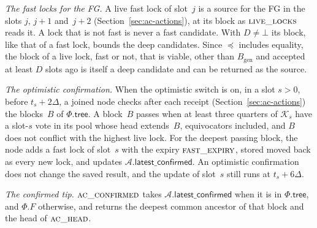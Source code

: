 \documentclass{article}
\newcommand{\genesis}{B_{\mathrm{gen}}}
\newcommand{\committee}{\mathcal K}
\newcommand{\AC}{\mathcal A}
\newcommand{\Fr}{\Phi}
\newcommand{\tree}{\mathsf{tree}}
\newcommand{\latestConfirmed}{\mathsf{latest\_confirmed}}
\begin{document}
\emph{The fast locks for the FG.}  A live fast lock of slot~$j$ is a
source for the FG in the slots $j$, $j+1$ and~$j+2$
(Section~\ref{sec:ac-actions}), at its block as $\Call{live\_locks}{}$
reads it.  A lock that is not fast is never a fast candidate.  With
$D\neq\bot$ its block, like that of a fast lock, bounds the deep candidates.
Since $\preceq$ includes equality, the block of a live lock, fast or not, that
is viable, other than $\genesis$ and accepted at least $D$ slots ago is itself
a deep candidate and can be returned as the source.

\emph{The optimistic confirmation.}  When the optimistic switch is on, in a
slot $s>0$, before $t_s+2\Delta$, a joined node checks after each receipt
(Section~\ref{sec:ac-actions}) the blocks~$B$ of $\Fr.\tree$.  A
block~$B$ passes when at least three quarters of $\committee_s$ have a
slot-$s$ vote in its pool whose head extends~$B$, equivocators included,
and $B$ does not conflict with the highest live lock.  For the deepest passing block,
the node adds a fast lock of slot~$s$ with the expiry
$\Call{fast\_expiry}{}$, stored moved back as every new
lock, and updates $\AC.\latestConfirmed$.  An optimistic confirmation does not change the saved result, and
the update of slot~$s$ still runs at $t_s+6\Delta$.

\emph{The confirmed tip.}  $\Call{ac\_confirmed}{}$ takes
$\AC.\latestConfirmed$ when it is in $\Fr.\tree$, and $\Fr.F$ otherwise, and returns the deepest common
ancestor of that block and the head of $\Call{ac\_head}{}$.
\end{document}

